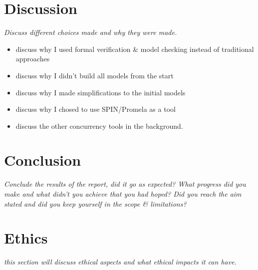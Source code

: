 \chapter{Discussion} 

\textit{Discuss different choices made and why they were made.} \\

\begin{itemize}
\item discuss why I used formal verification \& model checking instead of traditional approaches
\item discuss why I didn't build all models from the start
\item discuss why I made simplifications to the initial models
\item discuss why I chosed to use SPIN/Promela as a tool
\item discuss the other concurrency tools in the background.
\end{itemize}

\chapter{Conclusion}

\textit{Conclude the results of the report, did it go as expected? What progress did you make and what didn't you achieve that you had hoped? Did you reach the aim stated and did you keep yourself in the scope \& limitations? }

\chapter{Ethics}

\textit{this section will discuss ethical aspects and what ethical impacts it can have.}
